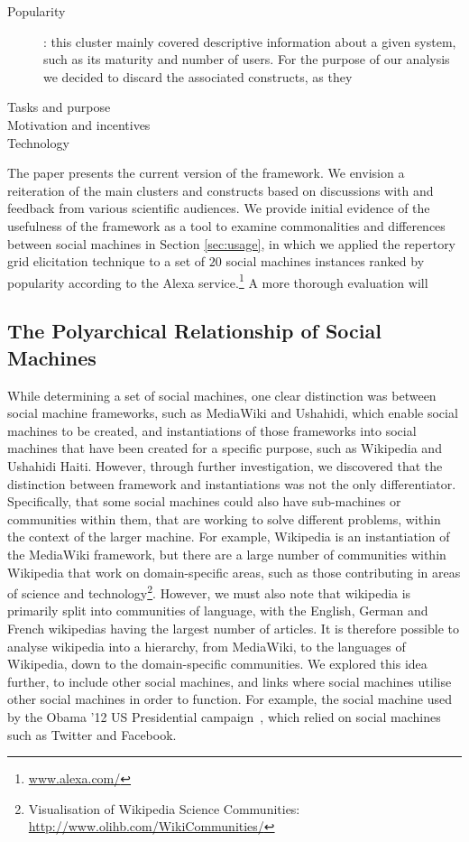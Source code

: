 \documentclass{sig-alternate}
\begin{document}
\begin{description}
  \item [Popularity]: this cluster mainly covered descriptive information about a given system, such as its maturity and number of users. For the purpose of our analysis we decided to discard the associated constructs, as they 
  \item [Tasks and purpose]
  \item [Motivation and incentives]
  \item [Technology]
\end{description}

The paper presents the current version of the framework. We envision a reiteration of the main clusters and constructs based on discussions with and feedback from various scientific audiences. We provide initial evidence of the usefulness of the framework as a tool to  examine commonalities and differences between social machines in Section \ref{sec:usage}, in which we applied the repertory grid elicitation technique to a set of $20$ social machines instances ranked by popularity according to the Alexa service.\footnote{\url{www.alexa.com/}} A more thorough evaluation will 

\subsection{The Polyarchical Relationship of Social Machines}

While determining a set of social machines, one clear distinction was between social machine frameworks, such as MediaWiki and Ushahidi, which enable
social machines to be created, and instantiations of those frameworks into social machines that have been created for a specific purpose, such as Wikipedia
and Ushahidi Haiti. However, through further investigation, we discovered that the distinction between framework and instantiations was not the only
differentiator. Specifically, that some social machines could also have sub-machines or communities within them, that are working to solve different problems,
within the context of the larger machine. For example, Wikipedia is an instantiation of the MediaWiki framework, but there are a large number of
communities within Wikipedia that work on domain-specific areas, such as those contributing in areas of science and technology\footnote{Visualisation of Wikipedia Science Communities: \url{http://www.olihb.com/WikiCommunities/}}. However, we must also note that wikipedia is primarily split into communities of language, with the English, German and French wikipedias having the largest number of articles. It is therefore possible to analyse wikipedia into a hierarchy, from MediaWiki, to the languages of Wikipedia, down to the domain-specific communities. We explored this idea further, to include other social machines, and links where social machines utilise other social machines in order to function. For example, the social machine used by the Obama '12 US Presidential campaign~\cite{obamakieron}, which relied on social machines such as Twitter and Facebook.
\end{document}
